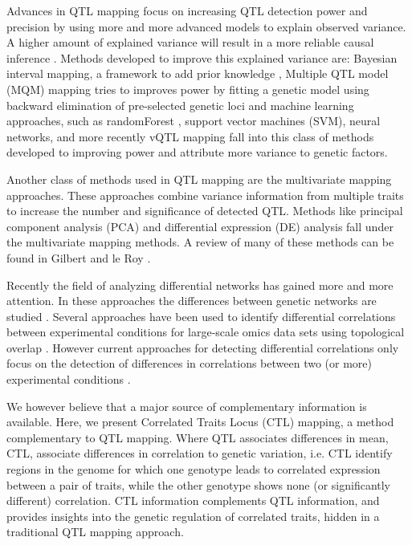  Advances in QTL mapping focus on increasing QTL detection power and precision by using more and more advanced models to explain 
  observed variance. A higher amount of explained variance will result in a more reliable causal inference \cite{Li:2010}. Methods 
  developed to improve this explained variance are: Bayesian interval mapping, a framework to add prior knowledge \cite{Yandell:2007, 
  Hageman:2011}, Multiple QTL model (MQM) mapping tries to improves power by fitting a genetic model using backward elimination of 
  pre-selected genetic loci\cite{Jansen:1993, Arends:2010} and machine learning approaches, such as randomForest \cite{Bureau:2003}, 
  support vector machines (SVM), neural networks, and more recently vQTL mapping \cite{Valdar:2011} fall into this class of methods
  developed to improving power and attribute more variance to genetic factors.

  Another class of methods used in QTL mapping are the multivariate mapping approaches. These approaches combine variance information 
  from multiple traits to increase the number and significance of detected QTL. Methods like principal component analysis (PCA) and 
  differential expression (DE) analysis fall under the multivariate mapping methods. A review of many of these methods can be found 
  in Gilbert and le Roy \cite{Gilbert:2003}.

  Recently the field of analyzing differential networks has gained more and more attention. In these approaches the differences 
  between genetic networks are studied \cite{Fuente:2010,Horvath:2008}. Several approaches have been used to identify differential 
  correlations between experimental conditions for large-scale omics data sets using topological overlap \cite{Tesson:2010}. However 
  current approaches for detecting differential correlations only focus on the detection of differences in correlations between 
  two (or more) experimental conditions \cite{Fukushima:2013, Tesson:2010,Horvath:2008}. 

  We however believe that a major source of complementary information is available. Here, we present Correlated Traits Locus (CTL) 
  mapping, a method complementary to QTL mapping. Where QTL associates differences in mean, CTL, associate differences in correlation to 
  genetic variation, i.e. CTL identify regions in the genome for which one genotype leads to correlated expression between a pair of 
  traits, while the other genotype shows none (or significantly different) correlation. CTL information complements QTL information, 
  and provides insights into the genetic regulation of correlated traits, hidden in a traditional QTL mapping approach.
  
